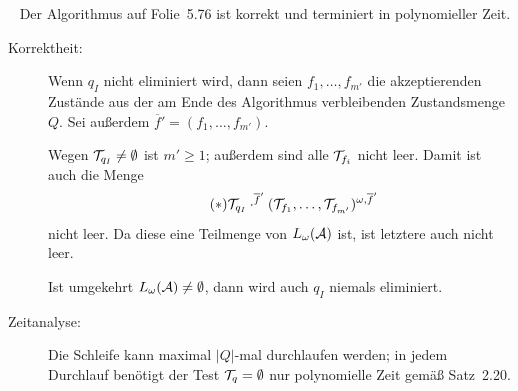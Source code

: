 \documentclass[fontsize=11pt, twoside=false, numbers=autoenddot]{scrbook}
\begin{document}
~
Der Algorithmus auf Folie~5.76 ist korrekt und terminiert in polynomieller Zeit.
\parII
{}
%
\begin{description}
  \item[Korrektheit:]
    Wenn $q_I$ nicht eliminiert wird, dann seien $f_1,\dots,f_{m'}$
    die akzeptierenden Zustände aus der am Ende des Algorithmus
    verbleibenden Zustandsmenge $Q$.
    Sei außerdem $\overline{f}' = (f_1,\dots,f_{m'})$.
    
    Wegen $\mathcal{T}_{q_I} \neq \emptyset$ ist $m' \geq 1$;
    außerdem sind alle $\mathcal{T}_{f_i}$ nicht leer.
    Damit ist auch die Menge
    \[
      \tag{$*$}
      \mathcal{T}_{q_I} \cdot^{\overline{f}'} (\mathcal{T}_{f_1},\dots,\mathcal{T}_{f_{m'}})^{\omega,\overline{f}'}
    \]
    nicht leer. Da diese eine Teilmenge von $L_\omega(\mathcal{A})$ ist,
    ist letztere auch nicht leer.
    
    \parI
    Ist umgekehrt $L_\omega(\mathcal{A}) \neq \emptyset$,
    dann wird auch $q_I$ niemals eliminiert.
  \item[Zeitanalyse:]
    Die Schleife kann maximal $|Q|$-mal durchlaufen werden;
    in jedem Durchlauf benötigt der Test $\mathcal{T}_q = \emptyset$
    nur polynomielle Zeit gemäß Satz~2.20.
    \qedhere
\end{description}
\end{document}
